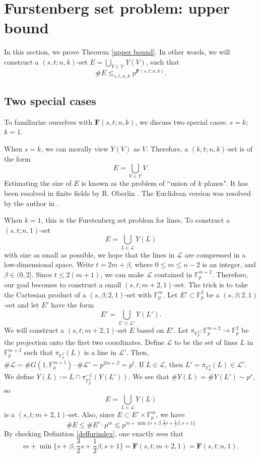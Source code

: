 \documentclass[10pt]{article}
\newcommand{\cL}{\mathcal{L}}
\newcommand{\cV}{\mathcal{V}}
\newcommand{\bF}{\mathbf{F}}
\newcommand{\Fp}{\mathbb{F}_p}
\begin{document}
\section{Furstenberg set problem: upper bound}\label{sec3}

In this section, we prove Theorem \ref{upper bound}. In other words, we will construct a $(s,t;n,k)$-set $E=\bigcup_{V\in\cV}Y(V)$, such that
\[ \#E\lesssim_{s,t,n,k} p^{\bF(s,t;n,k)}.\]
  

\subsection{Two special cases} To familiarize ourselves with $\bF(s,t;n,k)$, we discuss two special cases: $s=k$; $k=1$.

When $s=k$, we can morally view $Y(V)$ as $V$. Therefore, a $(k,t;n,k)$-set is of the form
\[ E=\bigcup_{V\in\cV}V. \]
Estimating the size of $E$ is known as the problem of ``union of $k$ planes". It has been resolved in finite fields by R. Oberlin \cite{oberlin2016unions}. The Euclidean version was resolved by the author in \cite{gan2023hausdorff}.

When $k=1$, this is the Furstenberg set problem for lines. To construct a $(s,t;n,1)$-set 
\[ E=\bigcup_{L\in\cL}Y(L) \]
with size as small as possible, we hope that the lines in $\cL$ are compressed in a low-dimensional space. 
Write $t=2m+\beta$, where $0\le m\le n-2$ is an integer, and $\beta\in (0,2]$. Since $t\le 2(m+1)$, we can make $\cL$ contained in $\Fp^{m+2}$. Therefore, our goal becomes to construct a small $(s,t;m+2,1)$-set. The trick is to take the Cartesian product of a $(s,\beta;2,1)$-set with $\Fp^m$. Let $E'\subset \Fp^2$ be a $(s,\beta;2,1)$-set and let $E'$ have the form
\[ E'=\bigcup_{L'\in \cL'}Y(L'). \]
We will construct a $(s,t;m+2,1)$-set $E$ based on $E'$. Let $\pi_{\Fp^2}:\Fp^{m+2}\rightarrow \Fp^2$ be the projection onto the first two coordinates. Define $\cL$ to be the set of lines $L$ in $\Fp^{m+2}$ such that $\pi_{\Fp^2}(L)$ is a line in $\cL'$. Then, $\#\cL\sim \# G(1,\Fp^{m+1})\cdot \#\cL'\sim p^{2m+\beta}=p^t$. If $L\in \cL$, then $L'=\pi_{\Fp^2}(L)\in \cL'$. We define $Y(L):=L\cap \pi_{\Fp^2}^{-1}(Y(L'))$. We see that $\#Y(L)=\#Y(L')\sim p^s$, so 
\[ E=\bigcup_{L\in\cL}Y(L) \]
is a $(s,t;m+2,1)$-set.
Also, since $E\subset E'\times \Fp^m$, we have
\[ \#E\le\#E'\cdot p^m\lesssim p^{m+\min\{s+\beta,\frac32s+\frac12\beta,s+1\}}  \]
By checking Definition \ref{deffurindex}, one exactly sees that
    \[ m+\min\{s+\beta,\frac32s+\frac12\beta,s+1\}=\bF(s,t;m+2,1)=\bF(s,t;n,1). \]
\end{document}
